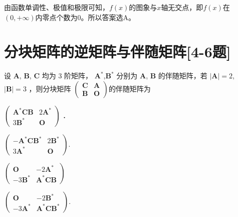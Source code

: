 \begin{solution}
    由函数单调性、极值和极限可知，\(f(x)\)的图象与\(x\)轴无交点，即\(f(x)\)在\((0, +\infty)\)内零点个数为\(0\)。所以答案选A。
\end{solution}
\section*{分块矩阵的逆矩阵与伴随矩阵[4-6题]}
\begin{question}
    设  $\mathbf{A}$, $\mathbf{B}$, $\mathbf{C}$  均为 3 阶矩阵，  $\mathbf{A}^{*}$,$\mathbf{B}^{*}$  分别为  $\mathbf{A}$, $\mathbf{B}$  的伴随矩阵，若 $ |\mathbf{A}| = 2$,$|\mathbf{B}| = 3$  ，则分块矩阵  $\left(\begin{array}{ll}\mathbf{C} & \mathbf{A} \\ \mathbf{B} & \mathbf{O}\end{array}\right)  $的伴随矩阵为
    \begin{choices}
      \item $\left(\begin{array}{cc}\mathbf{A}^{*} \mathbf{C B} & 2 \mathbf{A}^{*} \\ 3 \mathbf{B}^{*} & \mathbf{O}\end{array}\right) $ ．
      \item $\left(\begin{array}{cc}-\mathbf{A}^{*} \mathbf{C B}^{*} & 2 \mathbf{B}^{*} \\ 3 \mathbf{A}^{*} & \mathbf{O}\end{array}\right)$.
      \item $\left(\begin{array}{cc}\mathbf{O} & -2 \mathbf{A}^{*} \\ -3 \mathbf{B}^{*} & \mathbf{A}^{*} \mathbf{C B}\end{array}\right)$
      \item $\left(\begin{array}{cc}\mathbf{O} & -2 \mathbf{B}^{*} \\ -3 \mathbf{A}^{*} & \mathbf{A}^{*} \mathbf{C} \mathbf{B}^{*}\end{array}\right)$.
    \end{choices}
  \end{question}
